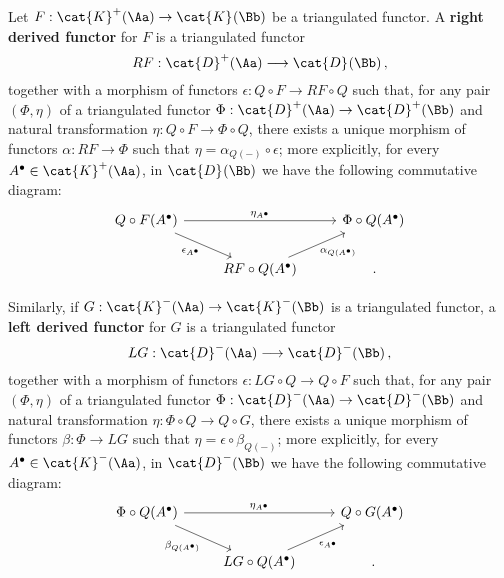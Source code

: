 \begin{df}
    Let $F:\cat{K}^{+}(\Aa) \to \cat{K}^{}(\Bb)$ be a triangulated functor.
    A \textbf{right derived functor} for $F$ is a triangulated functor
    \begin{equation*}
        RF : \cat{D}^{+}(\Aa) \longrightarrow \cat{D}^{}(\Bb)\,,
    \end{equation*}
    together with a morphism of functors
        $\epsilon : Q \circ F \to RF \circ Q$ such that,
        for any pair $(\Phi,\eta)$ of a triangulated functor
        $\Phi:\cat{D}^{+}(\Aa) \to \cat{D}^{+}{(\Bb)}$ and natural
        transformation $\eta : Q \circ F \to \Phi \circ Q$,
        there exists a unique morphism of functors
        $\alpha : RF \to \Phi$ such that
        $\eta = \alpha_{Q(-)} \circ \epsilon$;
        more explicitly, for every $A^{\bullet} \in \cat{K}^{+}(\Aa)$,
        in $\cat{D}^{}(\Bb)$ we have the following commutative diagram:
        \begin{equation*}
            \begin{tikzcd}
                Q \circ F(A^{\bullet}) \ar[rr, "\eta_{A^{\bullet}}"]
                \ar[dr, "\epsilon_{A^{\bullet}}"']
                & & \Phi \circ Q(A^{\bullet}) \\
                & RF \circ Q (A^{\bullet}) \ar[ur, "\alpha_{Q(A^{\bullet})}"'] & \,.
            \end{tikzcd}
        \end{equation*}

    Similarly, if $G:\cat{K}^{-}(\Aa) \to \cat{K}^{-}(\Bb)$ is a triangulated functor,
    a \textbf{left derived functor} for $G$ is a triangulated functor
    \begin{equation*}
        LG : \cat{D}^{-}(\Aa) \longrightarrow \cat{D}^{-}(\Bb)\,,
    \end{equation*}
    together with a morphism of functors
        $\epsilon : LG \circ Q \to Q \circ F$ such that,
        for any pair $(\Phi,\eta)$ of a triangulated functor
        $\Phi:\cat{D}^{-}(\Aa) \to \cat{D}^{-}{(\Bb)}$ and natural
        transformation $\eta : \Phi \circ Q \to Q \circ G$,
        there exists a unique morphism of functors
        $\beta : \Phi \to LG$ such that
        $\eta = \epsilon \circ \beta_{Q(-)}$;
        more explicitly, for every $A^{\bullet} \in \cat{K}^{-}(\Aa)$,
        in $\cat{D}^{-}(\Bb)$ we have the following commutative diagram:
        \begin{equation*}
            \begin{tikzcd}
                \Phi \circ Q(A^{\bullet}) \ar[rr, "\eta_{A^{\bullet}}"]
                \ar[dr, "\beta_{Q(A^{\bullet})}"']
                & & Q \circ G(A^{\bullet}) \\
                & LG \circ Q (A^{\bullet}) \ar[ur, "\epsilon_{A^{\bullet}}"'] & \,.
            \end{tikzcd}
        \end{equation*}
\end{df}

